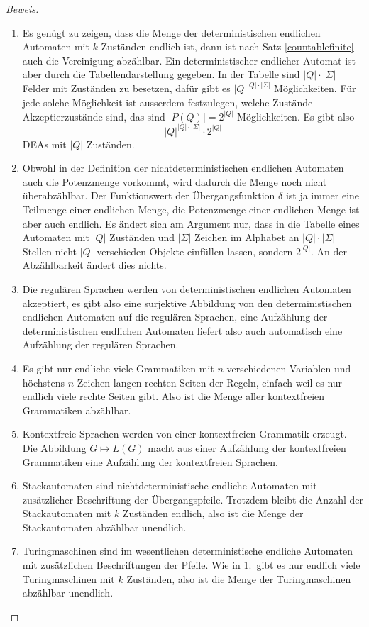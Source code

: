 \begin{proof}[Beweis]
\begin{enumerate}
\item Es genügt zu zeigen, dass die Menge der deterministischen
endlichen Automaten mit $k$ Zuständen endlich ist, dann ist nach
Satz \ref{countablefinite} auch die Vereinigung abzählbar. Ein
deterministischer endlicher Automat ist aber durch die Tabellendarstellung
gegeben. In der Tabelle sind $|Q|\cdot|\Sigma|$ Felder mit Zuständen
zu besetzen, dafür gibt es $|Q|^{|Q|\cdot|\Sigma|}$ Möglichkeiten.
Für jede solche Möglichkeit ist ausserdem festzulegen, welche Zustände
Akzeptierzustände sind, das sind $|P(Q)|=2^{|Q|}$ Möglichkeiten. Es gibt
also
\[
|Q|^{|Q|\cdot|\Sigma|}\cdot 2^{|Q|}
\]
DEAs mit $|Q|$ Zuständen.
\item Obwohl in der Definition der nichtdeterministischen endlichen
Automaten auch die Potenzmenge vorkommt, wird dadurch die Menge
noch nicht über\-abzählbar. Der Funktionswert der Übergangsfunktion
$\delta$ ist ja immer eine Teilmenge einer endlichen Menge, die Potenzmenge
einer endlichen Menge ist aber auch endlich. Es ändert sich am Argument
nur, dass in die Tabelle eines Automaten mit $|Q|$ Zuständen und
$|\Sigma|$ Zeichen im Alphabet an $|Q|\cdot|\Sigma|$ Stellen
nicht $|Q|$ verschieden Objekte einfüllen lassen, sondern $2^{|Q|}$.
An der Abzählbarkeit ändert dies nichts.
\item Die regulären Sprachen werden von deterministischen endlichen
Automaten akzeptiert, es gibt also eine surjektive Abbildung von
den deterministischen endlichen Automaten auf die regulären Sprachen,
eine Aufzählung der deterministischen endlichen Automaten liefert also
auch automatisch eine Aufzählung der regulären Sprachen.
\item Es gibt nur endliche viele Grammatiken mit $n$ verschiedenen
Variablen und höchstens $n$ Zeichen langen rechten Seiten der Regeln,
einfach weil es nur endlich viele rechte Seiten gibt. Also ist die
Menge aller kontextfreien Grammatiken abzählbar.
\item Kontextfreie Sprachen werden von einer kontextfreien Grammatik
erzeugt. Die Abbildung $G\mapsto L(G)$ macht aus einer Aufzählung
der kontextfreien Grammatiken eine Aufzählung der kontextfreien Sprachen.
\item Stackautomaten sind nichtdeterministische endliche Automaten mit
zusätzlicher Beschriftung der Übergangspfeile. Trotzdem bleibt die
Anzahl der Stackautomaten mit $k$ Zuständen endlich, also ist die
Menge der Stackautomaten abzählbar unendlich.
\item Turingmaschinen sind im wesentlichen deterministische endliche Automaten
mit zusätzlichen Beschriftungen der Pfeile. Wie in 1.~gibt es nur endlich
viele Turingmaschinen mit $k$ Zuständen, also ist die Menge der Turingmaschinen
abzählbar unendlich.
\end{enumerate}
\end{proof}

